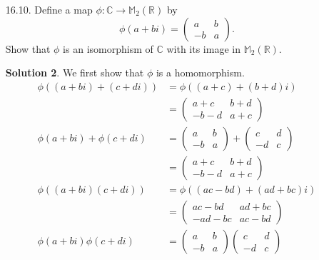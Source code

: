 \documentclass{article}
\newcommand{\RR}{\mathbb{R}}
\newcommand{\CC}{\mathbb{C}}
\newcommand{\ZZ}{\mathbb{Z}}
\theoremstyle{definition}
\newtheorem*{solution}{Solution}
\begin{document}
\begin{enumerate}
\begin{solution}
In both cases, adding a multiple of $6$ to $n$ changes the result by a multiple of $15$ ($0$ in the first case and $60$ in the second), so they are well defined.  They are additive group homomorphisms by the distributive law in $\ZZ_{15}$.  They are multiplicative since
\begin{align*}
0 \cdot 0 &= 0 \\
(10n) \cdot (10m) &= 100nm = 10nm.
\end{align*}
\end{solution}
\item[16.10.] Define a map $\phi : \CC \to \mathbb{M}_2(\RR)$ by
\[
\phi(a + bi) = \begin{pmatrix} a & b \\ -b & a \end{pmatrix}.
\]
Show that $\phi$ is an isomorphism of $\CC$ with its image in $\mathbb{M}_2(\RR)$.
\begin{solution}
We first show that $\phi$ is a homomorphism.
\begin{align*}
\phi((a + bi) + (c + di)) &= \phi((a + c) + (b + d)i) \\
&= \begin{pmatrix} a + c & b + d \\ -b - d & a + c \end{pmatrix} \\
\phi(a + bi) + \phi(c + di) &= \begin{pmatrix} a & b \\ -b & a \end{pmatrix} + \begin{pmatrix} c & d \\ -d & c \end{pmatrix} \\
&= \begin{pmatrix} a + c & b + d \\ -b - d & a + c \end{pmatrix} \\
\phi((a + bi)(c + di)) &= \phi((ac - bd) + (ad + bc)i) \\
&= \begin{pmatrix} ac - bd & ad + bc \\ -ad - bc & ac - bd \end{pmatrix} \\
\phi(a + bi)\phi(c + di) &= \begin{pmatrix} a & b \\ -b & a \end{pmatrix} \begin{pmatrix} c & d \\ -d & c \end{pmatrix} \\

\end{align*}
\end{solution}
\end{enumerate}
\end{document}
